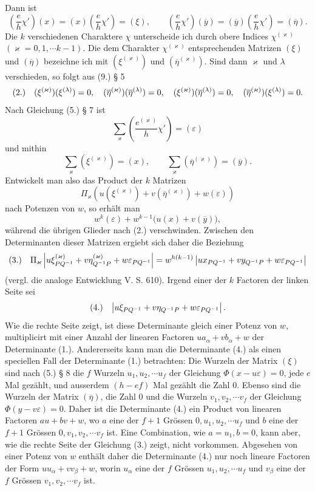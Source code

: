 \documentclass[11pt]{article}
\makeatletter
\newcommand{\frobtag}[2]{\[\begin{array}{@{}r@{\quad}l@{}}\textup{(#1)} & \displaystyle #2\end{array}\]}
\newcommand{\frobtagc}[2]{\[\begin{array}{@{}r@{\quad}c@{}}\textup{(#1)} & \displaystyle #2\end{array}\]}
\makeatother
\begin{document}
\clearpage
Dann ist
\[
\left(\frac{e}{h}\chi'\right)(x)=(x)\left(\frac{e}{h}\chi'\right)=(\xi),
\qquad
\left(\frac{e}{h}\chi'\right)(\overline{y})=(\overline{y})\left(\frac{e}{h}\chi'\right)=(\overline{\eta}).
\]
Die $k$ verschiedenen Charaktere $\chi$ unterscheide ich durch obere Indices $\chi^{(\varkappa)}$ $(\varkappa=0,1,\cdots k-1)$. Die dem Charakter $\chi^{(\varkappa)}$ entsprechenden Matrizen $(\xi)$ und $(\overline{\eta})$ bezeichne ich mit $(\xi^{(\varkappa)})$ und $(\overline{\eta}^{(\varkappa)})$. Sind dann $\varkappa$ und $\lambda$ verschieden, so folgt aus (9.) § 5
\frobtagc{2.}{(\xi^{(\varkappa)})(\xi^{(\lambda)})=0,\quad (\overline{\eta}^{(\varkappa)})(\overline{\eta}^{(\lambda)})=0,\quad (\xi^{(\varkappa)})(\overline{\eta}^{(\lambda)})=0,\quad (\overline{\eta}^{(\varkappa)})(\xi^{(\lambda)})=0.}
Nach Gleichung (5.) § 7 ist
\[
\sum_\varkappa\left(\frac{e^{(\varkappa)}}{h}\chi'\right)=(\varepsilon)
\]
und mithin
\[
\sum_\varkappa(\xi^{(\varkappa)})=(x),\qquad \sum_\varkappa(\overline{\eta}^{(\varkappa)})=(\overline{y}).
\]
Entwickelt man also das Product der $k$ Matrizen
\[
\Pi_\varkappa\left(u(\xi^{(\varkappa)})+v(\overline{\eta}^{(\varkappa)})+w(\varepsilon)\right)
\]
nach Potenzen von $w$, so erhält man
\[
w^k(\varepsilon)+w^{k-1}\bigl(u(x)+v(\overline{y})\bigr),
\]
während die übrigen Glieder nach (2.) verschwinden. Zwischen den Determinanten dieser Matrizen ergiebt sich daher die Beziehung
\frobtag{3.}{\Pi_\varkappa\left|u\xi_{PQ^{-1}}^{(\varkappa)}+v\eta_{Q^{-1}P}^{(\varkappa)}+w\varepsilon_{PQ^{-1}}\right|=w^{h(k-1)}\left|ux_{PQ^{-1}}+vy_{Q^{-1}P}+w\varepsilon_{PQ^{-1}}\right|}
(vergl. die analoge Entwicklung V. S. 610). Irgend einer der $k$ Factoren der linken Seite sei
\frobtagc{4.}{\left|u\xi_{PQ^{-1}}+v\eta_{Q^{-1}P}+w\varepsilon_{PQ^{-1}}\right|.}
Wie die rechte Seite zeigt, ist diese Determinante gleich einer Potenz von $w$, multiplicirt mit einer Anzahl der linearen Factoren $ua_\alpha+vb_\alpha+w$ der Determinante (1.). Andererseits kann man die Determinante (4.) als einen speciellen Fall der Determinante (1.) betrachten: Die Wurzeln der Matrix $(\xi)$ sind nach (5.) § 8 die $f$ Wurzeln $u_1,u_2,\cdots u_f$ der Gleichung $\Phi(x-u\varepsilon)=0$, jede $e$ Mal gezählt, und ausserdem $(h-ef)$ Mal gezählt die Zahl $0$. Ebenso sind die Wurzeln der Matrix $(\overline{\eta})$, die Zahl $0$ und die Wurzeln $v_1,v_2,\cdots v_f$ der Gleichung $\Phi(y-v\varepsilon)=0$. Daher ist die Determinante (4.) ein Product von linearen Factoren $au+bv+w$, wo $a$ eine der $f+1$ Grössen $0,u_1,u_2,\cdots u_f$ und $b$ eine der $f+1$ Grössen $0,v_1,v_2,\cdots v_f$ ist. Eine Combination, wie $a=u_1,b=0$, kann aber, wie die rechte Seite der Gleichung (3.) zeigt, nicht vorkommen. Abgesehen von einer Potenz von $w$ enthält daher die Determinante (4.) nur noch lineare Factoren der Form $uu_\alpha+vv_\beta+w$, worin $u_\alpha$ eine der $f$ Grössen $u_1,u_2,\cdots u_f$ und $v_\beta$ eine der $f$ Grössen $v_1,v_2,\cdots v_f$ ist.
\end{document}
